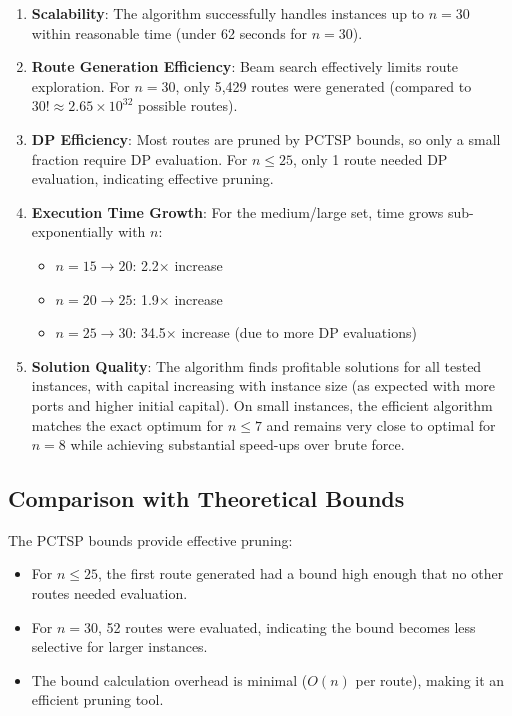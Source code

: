 \documentclass[12pt]{article}
\begin{document}
\begin{enumerate}
    \item \textbf{Scalability}: The algorithm successfully handles instances up to $n=30$ within reasonable time (under 62 seconds for $n=30$).
    
    \item \textbf{Route Generation Efficiency}: Beam search effectively limits route exploration. For $n=30$, only 5,429 routes were generated (compared to $30! \approx 2.65 \times 10^{32}$ possible routes).
    
    \item \textbf{DP Efficiency}: Most routes are pruned by PCTSP bounds, so only a small fraction require DP evaluation. For $n \leq 25$, only 1 route needed DP evaluation, indicating effective pruning.
    
    \item \textbf{Execution Time Growth}: For the medium/large set, time grows sub-exponentially with $n$:
    \begin{itemize}
        \item $n=15 \rightarrow 20$: 2.2$\times$ increase
        \item $n=20 \rightarrow 25$: 1.9$\times$ increase  
        \item $n=25 \rightarrow 30$: 34.5$\times$ increase (due to more DP evaluations)
    \end{itemize}
    
    \item \textbf{Solution Quality}: The algorithm finds profitable solutions for all tested instances, with capital increasing with instance size (as expected with more ports and higher initial capital). On small instances, the efficient algorithm matches the exact optimum for $n \leq 7$ and remains very close to optimal for $n=8$ while achieving substantial speed-ups over brute force.
\end{enumerate}

\subsection{Comparison with Theoretical Bounds}

The PCTSP bounds provide effective pruning:
\begin{itemize}
    \item For $n \leq 25$, the first route generated had a bound high enough that no other routes needed evaluation.
    \item For $n=30$, 52 routes were evaluated, indicating the bound becomes less selective for larger instances.
    \item The bound calculation overhead is minimal ($O(n)$ per route), making it an efficient pruning tool.
\end{itemize}
\end{document}
